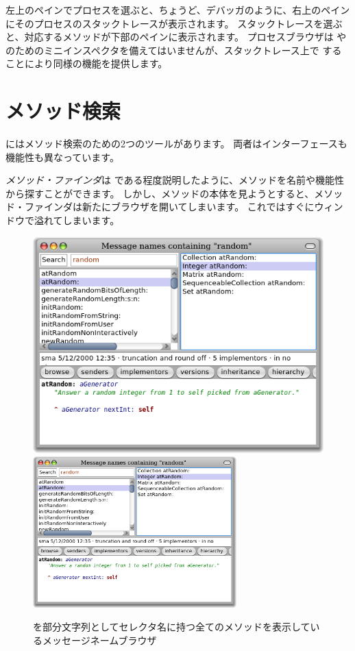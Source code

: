 \documentclass[a4paper,10pt,twoside]{book}
\begin{document}
左上のペインでプロセスを選ぶと、ちょうど、デバッガのように、右上のペインにそのプロセスのスタックトレースが表示されます。
スタックトレースを選ぶと、対応するメソッドが下部のペインに表示されます。
プロセスブラウザは \self や  のためのミニインスペクタを備えてはいませんが、スタックトレース上で  することにより同様の機能を提供します。

\section{メソッド検索}

\pharo にはメソッド検索のための2つのツールがあります。
両者はインターフェースも機能性も異なっています。

\emph{メソッド・ファインダ}は  である程度説明したように、メソッドを名前や機能性から探すことができます。
しかし、メソッドの本体を見ようとすると、メソッド・ファインダは新たにブラウザを開いてしまいます。
これではすぐにウィンドウで溢れてしまいます。

\begin{figure}[btp]
\begin{center}
\ifluluelse
{\includegraphics[width=\textwidth]{methodNamesRandom}}
{\includegraphics[width=0.7\textwidth]{methodNamesRandom}}
\end{center}
\caption{ を部分文字列としてセレクタ名に持つ全てのメソッドを表示しているメッセージネームブラウザ}
\end{figure}
\end{document}
